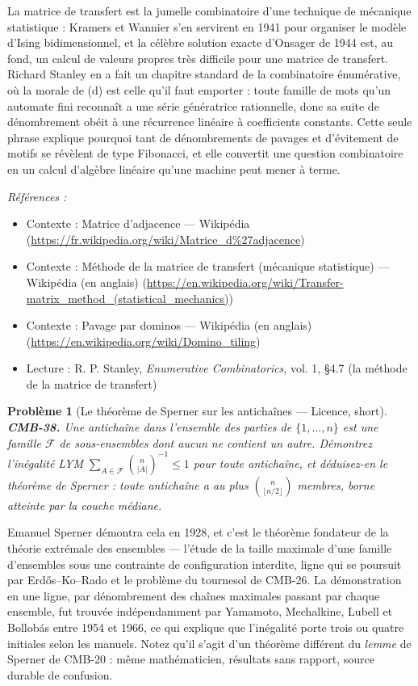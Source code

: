 \documentclass[11pt]{article}
\newtheorem{problem}{Problème}
\newenvironment{refs}{\par\small\noindent\emph{Références :}\begin{itemize}\setlength\itemsep{0pt}}{\end{itemize}\normalsize}
\begin{document}
\noindent La matrice de transfert est la jumelle combinatoire d'une technique de mécanique statistique : Kramers et Wannier s'en servirent en 1941 pour organiser le modèle d'Ising bidimensionnel, et la célèbre solution exacte d'Onsager de 1944 est, au fond, un calcul de valeurs propres très difficile pour une matrice de transfert. Richard Stanley en a fait un chapitre standard de la combinatoire énumérative, où la morale de (d) est celle qu'il faut emporter : toute famille de mots qu'un automate fini reconnaît a une série génératrice rationnelle, donc sa suite de dénombrement obéit à une récurrence linéaire à coefficients constants. Cette seule phrase explique pourquoi tant de dénombrements de pavages et d'évitement de motifs se révèlent de type Fibonacci, et elle convertit une question combinatoire en un calcul d'algèbre linéaire qu'une machine peut mener à terme.

\begin{refs}
\item Contexte : Matrice d'adjacence --- Wikipédia (\url{https://fr.wikipedia.org/wiki/Matrice_d%27adjacence})
\item Contexte : Méthode de la matrice de transfert (mécanique statistique) --- Wikipédia (en anglais) (\url{https://en.wikipedia.org/wiki/Transfer-matrix_method_(statistical_mechanics)})
\item Contexte : Pavage par dominos --- Wikipédia (en anglais) (\url{https://en.wikipedia.org/wiki/Domino_tiling})
\item Lecture : R. P. Stanley, \textit{Enumerative Combinatorics}, vol. 1, \S{}4.7 (la méthode de la matrice de transfert)
\end{refs}

\bigskip

\begin{problem}[{Le théorème de Sperner sur les antichaînes --- Licence, short}]
\textbf{CMB-38.} Une antichaîne dans l'ensemble des parties de $ \{1,\dots,n\} $ est une famille $ \mathcal{F} $ de sous-ensembles dont aucun ne contient un autre. Démontrez l'inégalité LYM $ \sum_{A \in \mathcal{F}} \binom{n}{|A|}^{-1} \le 1 $ pour toute antichaîne, et déduisez-en le théorème de Sperner : toute antichaîne a au plus $ \binom{n}{\lfloor n/2 \rfloor} $ membres, borne atteinte par la couche médiane.
\end{problem}

\noindent Emanuel Sperner démontra cela en 1928, et c'est le théorème fondateur de la théorie extrémale des ensembles --- l'étude de la taille maximale d'une famille d'ensembles sous une contrainte de configuration interdite, ligne qui se poursuit par Erd\H{o}s--Ko--Rado et le problème du tournesol de CMB-26. La démonstration en une ligne, par dénombrement des chaînes maximales passant par chaque ensemble, fut trouvée indépendamment par Yamamoto, Mechalkine, Lubell et Bollobás entre 1954 et 1966, ce qui explique que l'inégalité porte trois ou quatre initiales selon les manuels. Notez qu'il s'agit d'un théorème différent du \textit{lemme} de Sperner de CMB-20 : même mathématicien, résultats sans rapport, source durable de confusion.
\end{document}
